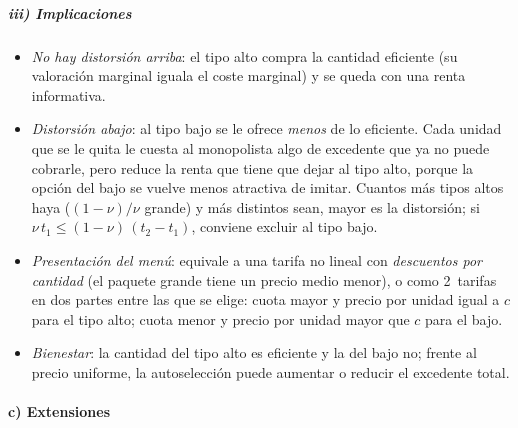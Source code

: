 \documentclass[11pt]{article}
\begin{document}
\subparagraph{iii) Implicaciones}

\begin{itemize}
\item \emph{No hay distorsión arriba}: el tipo alto compra la cantidad eficiente (su valoración marginal iguala el coste marginal) y se queda con una renta informativa.
\item \emph{Distorsión abajo}: al tipo bajo se le ofrece \emph{menos} de lo eficiente. Cada unidad que se le quita le cuesta al monopolista algo de excedente que ya no puede cobrarle, pero reduce la renta que tiene que dejar al tipo alto, porque la opción del bajo se vuelve menos atractiva de imitar. Cuantos más tipos altos haya ($(1-\nu)/\nu$ grande) y más distintos sean, mayor es la distorsión; si $\nu\,t_1\leq(1-\nu)\,(t_2-t_1)$, conviene excluir al tipo bajo.
\item \emph{Presentación del menú}: equivale a una tarifa no lineal con \emph{descuentos por cantidad} (el paquete grande tiene un precio medio menor), o como 2~tarifas en dos partes entre las que se elige: cuota mayor y precio por unidad igual a $c$ para el tipo alto; cuota menor y precio por unidad mayor que $c$ para el bajo.
\item \emph{Bienestar}: la cantidad del tipo alto es eficiente y la del bajo no; frente al precio uniforme, la autoselección puede aumentar o reducir el excedente total.
\end{itemize}

\paragraph{c) Extensiones}
\end{document}

